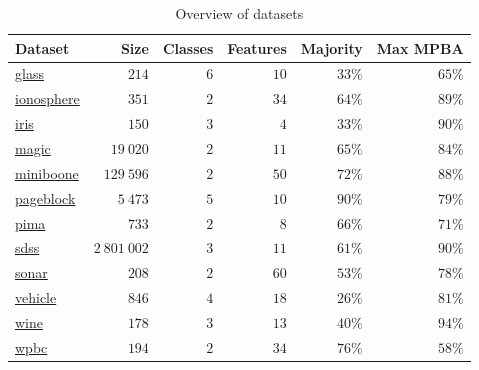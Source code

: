 \documentclass[fleqn,10pt,lineno]{wlpeerj} %
\begin{document}
\begin{table}[htbp]
	\caption {Overview of datasets} \label{tab:datasets}
	\centering
	\begin{tabular}{lrrrrr}
		\toprule
		{Dataset}  & Size &  Classes & Features & Majority & Max MPBA \\
		\midrule
        \href{https://archive.ics.uci.edu/ml/datasets/Glass+Identification}{glass}
        	& $214$ & $6$ & $10$ & $33\%$ & $65\%$ \\
		\href{https://archive.ics.uci.edu/ml/datasets/Ionosphere}{ionosphere}
			& $351$ & $2$ & $34$ & $64\%$ & $89\%$ \\
		\href{https://archive.ics.uci.edu/ml/datasets/Iris}{iris}
        	& $150$ & $3$ & $4$ & $33\%$ & $90\%$ \\
        \href{https://archive.ics.uci.edu/ml/datasets/MAGIC+Gamma+Telescope}{magic}
        	& $19~020$ & $2$ & $11$ & $65\%$ & $84\%$ \\
        \href{https://archive.ics.uci.edu/ml/datasets/MiniBooNE+particle+identification}{miniboone}
        	& $129~596$ & $2$ & $50$ & $72\%$ & $88\%$ \\
        \href{https://archive.ics.uci.edu/ml/datasets/Page+Blocks+Classification}{pageblock}
        	& $5~473$ & $5$ & $10$ & $90\%$ & $79\%$ \\
		\href{https://archive.ics.uci.edu/ml/datasets/Pima+Indians+Diabetes}{pima}
        	& $733$ & $2$ & $8$ & $66\%$ & $71\%$ \\
        \href{http://dx.doi.org/10.5281/zenodo.58500}{sdss}
        	& $2~801~002$ & $3$ & $11$ & $61\%$ & $90\%$ \\
		\href{https://archive.ics.uci.edu/ml/datasets/Connectionist+Bench+(Sonar,+Mines+vs.+Rocks)}{sonar}
        	& $208$ & $2$ & $60$ & $53\%$ & $78\%$ \\
        \href{https://archive.ics.uci.edu/ml/datasets/Statlog+(Vehicle+Silhouettes)}{vehicle}
			& $846$ & $4$ & $18$ & $26\%$ & $81\%$ \\
		\href{https://archive.ics.uci.edu/ml/datasets/Wine}{wine}
        	& $178$ & $3$ & $13$ & $40\%$ & $94\%$ \\
		\href{https://archive.ics.uci.edu/ml/datasets/Breast+Cancer+Wisconsin+(Prognostic)}{wpbc}
        	& $194$ & $2$ & $34$ & $76\%$ & $58\%$ \\
		\bottomrule
	\end{tabular}
\end{table}
\end{document}
